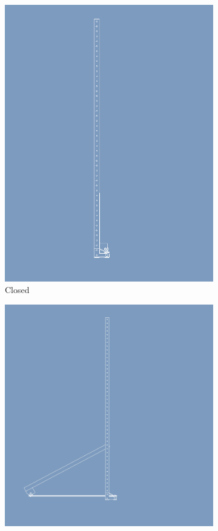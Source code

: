 \documentclass[12pt,letterpaper]{report}
\begin{document}
		\begin{figure}[H]
			\centering
			\begin{subfigure}{.45\textwidth}
				\includegraphics[width=\textwidth]{ShutterAssyDrawClose}
				\caption{Closed}
				\label{fig:ShutterProfileClose}
			\end{subfigure}
			\begin{subfigure}{.45\textwidth}
				\includegraphics[width=\textwidth]{ShutterAssyDrawOpen}

\end{subfigure}
\end{figure}
\end{document}
